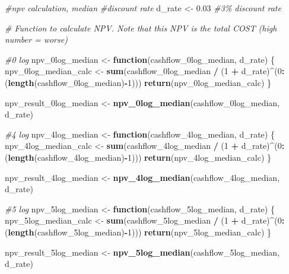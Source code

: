 \documentclass[
]{article}
\newenvironment{Shaded}{\begin{snugshade}}{\end{snugshade}}
\newcommand{\CommentTok}[1]{\textcolor[rgb]{0.56,0.35,0.01}{\textit{#1}}}
\newcommand{\ControlFlowTok}[1]{\textcolor[rgb]{0.13,0.29,0.53}{\textbf{#1}}}
\newcommand{\DecValTok}[1]{\textcolor[rgb]{0.00,0.00,0.81}{#1}}
\newcommand{\FloatTok}[1]{\textcolor[rgb]{0.00,0.00,0.81}{#1}}
\newcommand{\FunctionTok}[1]{\textcolor[rgb]{0.13,0.29,0.53}{\textbf{#1}}}
\newcommand{\NormalTok}[1]{#1}
\newcommand{\OtherTok}[1]{\textcolor[rgb]{0.56,0.35,0.01}{#1}}
\newcommand{\SpecialCharTok}[1]{\textcolor[rgb]{0.81,0.36,0.00}{\textbf{#1}}}
\begin{document}
\begin{Shaded}
\begin{Highlighting}[]
\CommentTok{\#npv calculation, median}
\CommentTok{\#discount rate}
\NormalTok{d\_rate }\OtherTok{\textless{}{-}} \FloatTok{0.03} \CommentTok{\#3\% discount rate}

\CommentTok{\# Function to calculate NPV. Note that this NPV is the total COST (high number = worse)}

\CommentTok{\#0 log}
\NormalTok{npv\_0log\_median }\OtherTok{\textless{}{-}} \ControlFlowTok{function}\NormalTok{(cashflow\_0log\_median, d\_rate) \{}
\NormalTok{  npv\_0log\_median\_calc }\OtherTok{\textless{}{-}} \FunctionTok{sum}\NormalTok{(cashflow\_0log\_median }\SpecialCharTok{/}\NormalTok{ (}\DecValTok{1} \SpecialCharTok{+}\NormalTok{ d\_rate)}\SpecialCharTok{\^{}}\NormalTok{(}\DecValTok{0}\SpecialCharTok{:}\NormalTok{(}\FunctionTok{length}\NormalTok{(cashflow\_0log\_median)}\SpecialCharTok{{-}}\DecValTok{1}\NormalTok{)))}
  \FunctionTok{return}\NormalTok{(npv\_0log\_median\_calc)}
\NormalTok{\}}

\NormalTok{npv\_result\_0log\_median }\OtherTok{\textless{}{-}} \FunctionTok{npv\_0log\_median}\NormalTok{(cashflow\_0log\_median, d\_rate)}


\CommentTok{\#4 log}
\NormalTok{npv\_4log\_median }\OtherTok{\textless{}{-}} \ControlFlowTok{function}\NormalTok{(cashflow\_4log\_median, d\_rate) \{}
\NormalTok{  npv\_4log\_median\_calc }\OtherTok{\textless{}{-}} \FunctionTok{sum}\NormalTok{(cashflow\_4log\_median }\SpecialCharTok{/}\NormalTok{ (}\DecValTok{1} \SpecialCharTok{+}\NormalTok{ d\_rate)}\SpecialCharTok{\^{}}\NormalTok{(}\DecValTok{0}\SpecialCharTok{:}\NormalTok{(}\FunctionTok{length}\NormalTok{(cashflow\_4log\_median)}\SpecialCharTok{{-}}\DecValTok{1}\NormalTok{)))}
  \FunctionTok{return}\NormalTok{(npv\_4log\_median\_calc)}
\NormalTok{\}}

\NormalTok{npv\_result\_4log\_median }\OtherTok{\textless{}{-}} \FunctionTok{npv\_4log\_median}\NormalTok{(cashflow\_4log\_median, d\_rate)}


\CommentTok{\#5 log}
\NormalTok{npv\_5log\_median }\OtherTok{\textless{}{-}} \ControlFlowTok{function}\NormalTok{(cashflow\_5log\_median, d\_rate) \{}
\NormalTok{  npv\_5log\_median\_calc }\OtherTok{\textless{}{-}} \FunctionTok{sum}\NormalTok{(cashflow\_5log\_median }\SpecialCharTok{/}\NormalTok{ (}\DecValTok{1} \SpecialCharTok{+}\NormalTok{ d\_rate)}\SpecialCharTok{\^{}}\NormalTok{(}\DecValTok{0}\SpecialCharTok{:}\NormalTok{(}\FunctionTok{length}\NormalTok{(cashflow\_5log\_median)}\SpecialCharTok{{-}}\DecValTok{1}\NormalTok{)))}
  \FunctionTok{return}\NormalTok{(npv\_5log\_median\_calc)}
\NormalTok{\}}

\NormalTok{npv\_result\_5log\_median }\OtherTok{\textless{}{-}} \FunctionTok{npv\_5log\_median}\NormalTok{(cashflow\_5log\_median, d\_rate)}
\end{Highlighting}
\end{Shaded}
\end{document}
